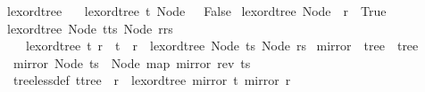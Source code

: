 \begin{isabellebox}
    \isamarkupfalse%
    \ lexord{\isacharunderscore}{\kern0pt}tree\ \isanewline
    \ \ {\isachardoublequoteopen}lexord{\isacharunderscore}{\kern0pt}tree\ t\ {\isacharparenleft}{\kern0pt}Node\ {\isacharbrackleft}{\kern0pt}{\isacharbrackright}{\kern0pt}{\isacharparenright}{\kern0pt}\ {\isasymlongleftrightarrow}\ False{\isachardoublequoteclose}\isanewline
    {\isacharbar}{\kern0pt}\ {\isachardoublequoteopen}lexord{\isacharunderscore}{\kern0pt}tree\ {\isacharparenleft}{\kern0pt}Node\ {\isacharbrackleft}{\kern0pt}{\isacharbrackright}{\kern0pt}{\isacharparenright}{\kern0pt}\ r\ {\isasymlongleftrightarrow}\ True{\isachardoublequoteclose}\isanewline
    {\isacharbar}{\kern0pt}\ {\isachardoublequoteopen}lexord{\isacharunderscore}{\kern0pt}tree\ {\isacharparenleft}{\kern0pt}Node\ {\isacharparenleft}{\kern0pt}t{\isacharhash}{\kern0pt}ts{\isacharparenright}{\kern0pt}{\isacharparenright}{\kern0pt}\ {\isacharparenleft}{\kern0pt}Node\ {\isacharparenleft}{\kern0pt}r{\isacharhash}{\kern0pt}rs{\isacharparenright}{\kern0pt}{\isacharparenright}{\kern0pt}\ {\isasymlongleftrightarrow}\isanewline
    \ \ \ \ lexord{\isacharunderscore}{\kern0pt}tree\ t\ r\ {\isasymor}\ {\isacharparenleft}{\kern0pt}t\ {\isacharequal}{\kern0pt}\ r\ {\isasymand}\ lexord{\isacharunderscore}{\kern0pt}tree\ {\isacharparenleft}{\kern0pt}Node\ ts{\isacharparenright}{\kern0pt}\ {\isacharparenleft}{\kern0pt}Node\ rs{\isacharparenright}{\kern0pt}{\isacharparenright}{\kern0pt}{\isachardoublequoteclose}\isanewline
    \isanewline
    \isamarkupfalse%
    \ mirror\ {\isacharcolon}{\kern0pt}{\isacharcolon}{\kern0pt}\ {\isachardoublequoteopen}tree\ {\isasymRightarrow}\ tree{\isachardoublequoteclose}\ \isanewline
    \ \ {\isachardoublequoteopen}mirror\ {\isacharparenleft}{\kern0pt}Node\ ts{\isacharparenright}{\kern0pt}\ {\isacharequal}{\kern0pt}\ Node\ {\isacharparenleft}{\kern0pt}map\ mirror\ {\isacharparenleft}{\kern0pt}rev\ ts{\isacharparenright}{\kern0pt}{\isacharparenright}{\kern0pt}{\isachardoublequoteclose}\isanewline
    \isanewline
    \isamarkupfalse%
    \isanewline
    \ \ tree{\isacharunderscore}{\kern0pt}less{\isacharunderscore}{\kern0pt}def{\isacharcolon}{\kern0pt}\ {\isachardoublequoteopen}{\isacharparenleft}{\kern0pt}t{\isacharcolon}{\kern0pt}{\isacharcolon}{\kern0pt}tree{\isacharparenright}{\kern0pt}\ {\isacharless}{\kern0pt}\ r\ {\isasymlongleftrightarrow}\ lexord{\isacharunderscore}{\kern0pt}tree\ {\isacharparenleft}{\kern0pt}mirror\ t{\isacharparenright}{\kern0pt}\ {\isacharparenleft}{\kern0pt}mirror\ r{\isacharparenright}{\kern0pt}{\isachardoublequoteclose}
\end{isabellebox}

